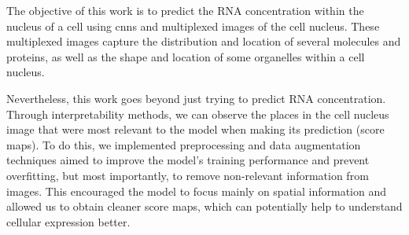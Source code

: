 
\glsresetall

The objective of this work is to predict the RNA concentration within the nucleus of a cell using \glspl{cnn} and multiplexed images of the cell nucleus. These multiplexed images capture the distribution and location of several molecules and proteins, as well as the shape and location of some organelles within a cell nucleus.

Nevertheless, this work goes beyond just trying to predict RNA concentration. Through interpretability methods, we can observe the places in the cell nucleus image that were most relevant to the model when making its prediction (score maps). To do this, we implemented preprocessing and data augmentation techniques aimed to improve the model's training performance and prevent overfitting, but most importantly, to remove non-relevant information from images. This encouraged the model to focus mainly on spatial information and allowed us to obtain cleaner score maps, which can potentially help to understand cellular expression better. 

